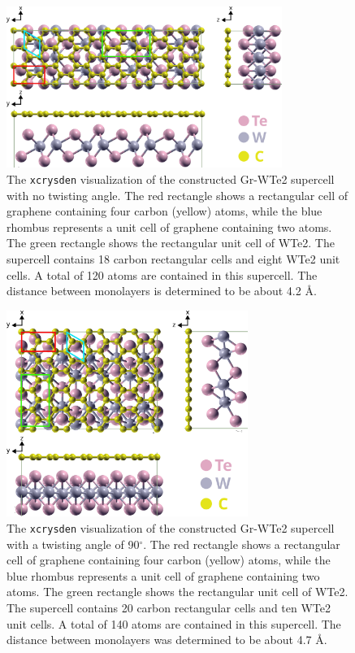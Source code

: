 \documentclass[10pt,a4paper]{labreport}
\begin{document}
\begin{figure}[h!]
  \centering 
  \includegraphics[width = 0.8\textwidth]{figs/ass3_notwist_struct.png}
  \caption{The \texttt{xcrysden} visualization of the constructed Gr-WTe2 supercell with no twisting angle. The red rectangle shows a rectangular cell of graphene containing four carbon (yellow) atoms, while the blue rhombus represents a unit cell of graphene containing two atoms. The green rectangle shows the rectangular unit cell of WTe2. The supercell contains 18 carbon rectangular cells and eight WTe2 unit cells. A total of 120 atoms are contained in this supercell. The distance between monolayers is determined to be about 4.2 \AA.}
  \label{fig:ass3_notwist_struct}
\end{figure}

\begin{figure}[h!]
  \centering 
  \includegraphics[width = 0.7\textwidth]{figs/ass3_twist_struct.png}
  \caption{The \texttt{xcrysden} visualization of the constructed Gr-WTe2 supercell with a twisting angle of 90$^\circ$. The red rectangle shows a rectangular cell of graphene containing four carbon (yellow) atoms, while the blue rhombus represents a unit cell of graphene containing two atoms. The green rectangle shows the rectangular unit cell of WTe2. The supercell contains 20 carbon rectangular cells and ten WTe2 unit cells. A total of 140 atoms are contained in this supercell. The distance between monolayers was determined to be about 4.7 \AA.}
  \label{fig:ass3_twist_struct}
\end{figure}
\end{document}
